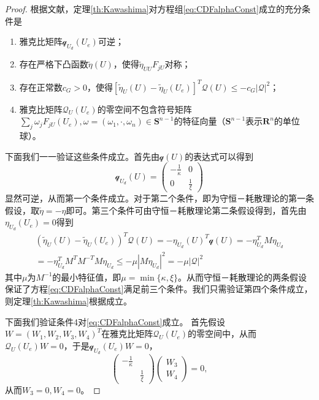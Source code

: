 	\begin{proof}
		根据文献\cite{yong2004entropy}，定理\ref{th:Kawashima}对方程组\eqref{eq:CDFalphaConst}成立的充分条件是
		\begin{enumerate}
			\item 雅克比矩阵$\mathcal{q}_{U_d}(U_e)$可逆；
			\item 存在严格下凸函数$\tilde{\eta}(U)$，使得$\tilde{\eta}_{UU}F_{jU}$对称；
			\item 存在正常数$c_G >0$，使得$[\tilde{\eta}_{U}(U) - \tilde{\eta}_{U}(U_e)]^T \mathcal{Q}(U) \le - c_G |\mathcal{Q}|^2$；
			\item 雅克比矩阵$\mathcal{Q}_U(U_e)$的零空间不包含符号矩阵$\sum_{j} \omega_j F_{jU}(U_e), \omega =(\omega_1, \cdot,\omega_n) \in \mathbf{S}^{n-1}$的特征向量（$\mathbf{S}^{n-1}$表示$\mathbf{R}^n$的单位球）。
		\end{enumerate}

		下面我们一一验证这些条件成立。首先由$\mathcal{q}(U)$的表达式可以得到
		\begin{equation*}
			\mathcal{q}_{U_d}(U) = \left( \begin{array}{cc} 
				-\frac{1}{\kappa} & 0 \\
				0 & \frac{1}{\xi}
			\end{array}\right)
		\end{equation*}
		显然可逆，从而第一个条件成立。对于第二个条件，即为守恒－耗散理论的第一条假设，取$\tilde{\eta} = -\eta$即可。第三个条件可由守恒－耗散理论第二条假设得到，首先由$\eta_{U_d}(U_e) = 0$得到
		\begin{eqnarray*}
			(\tilde{\eta}_{U}(U) - \tilde{\eta}_{U}(U_e))^T \mathcal{Q}(U) = -\eta_{U_d}(U)^T  \mathcal{q}(U) = -\eta_{U_d}^T M \eta_{U_d} \\
			= -\eta_{U_d}^T M^T M^{-T} M \eta_{U_d} \le -\mu |M\eta_{U_d}|^2 = - \mu |\mathcal{Q}|^2 
		\end{eqnarray*}
	其中$\mu$为$M^{-1}$的最小特征值，即$\mu= \min\{\kappa, \xi\}$。从而守恒－耗散理论的两条假设保证了方程\eqref{eq:CDFalphaConst}满足前三个条件。我们只需验证第四个条件成立，则定理\eqref{th:Kawashima}根据\cite{yong2004entropy}成立。

	下面我们验证条件4对\eqref{eq:CDFalphaConst}成立。
	首先假设$W = (W_1,W_2,W_3,W_4)^T$在雅克比矩阵$\mathcal{Q}_U(U_e)$的零空间中，从而$\mathcal{Q}_U(U_e) W = 0$，于是$\mathcal{q}_{U_d}(U_e) W=0$，
	\begin{equation*}
		\left( \begin{array}{cc} 
		-\frac{1}{\kappa} & \\
		&　\frac{1}{\xi} 
		\end{array} \right) 
		\left( \begin{array}{c} W_3 \\W_4 \end{array} \right) = 0,
	\end{equation*}
	从而$W_3=0,W_4=0$。


\end{proof}
